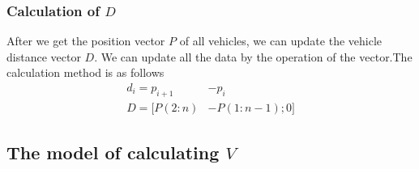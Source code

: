 \documentclass[UTF8]{mcmthesis}
\begin{document}
\subsubsection{Calculation of $D$}
After we get the position vector $P$ of all vehicles, we can update the vehicle distance vector $D$. We can update all the data by the operation of the vector.The calculation method is as follows
\begin{equation}
\begin{split}
	d_i=p_{i+1}&-p_{i}\\
	D=[P(2:n)&-P(1:n-1);0]
\end{split}
\end{equation}

\subsection{The model of calculating $V$}
\label{velocity change}
\end{document}
